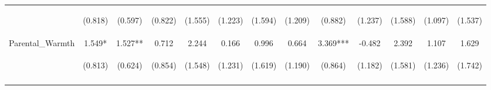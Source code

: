 \begin{tabular}{lcccccccccccc}
 & \begin{footnotesize}(0.818)\end{footnotesize} & \begin{footnotesize}(0.597)\end{footnotesize} & \begin{footnotesize}(0.822)\end{footnotesize} & \begin{footnotesize}(1.555)\end{footnotesize} & \begin{footnotesize}(1.223)\end{footnotesize} & \begin{footnotesize}(1.594)\end{footnotesize} & \begin{footnotesize}(1.209)\end{footnotesize} & \begin{footnotesize}(0.882)\end{footnotesize} & \begin{footnotesize}(1.237)\end{footnotesize} & \begin{footnotesize}(1.588)\end{footnotesize} & \begin{footnotesize}(1.097)\end{footnotesize} & \begin{footnotesize}(1.537)\end{footnotesize}\\
\noalign{\smallskip}Parental_Warmth & 1.549* & 1.527** & 0.712 & 2.244 & 0.166 & 0.996 & 0.664 & 3.369*** & -0.482 & 2.392 & 1.107 & 1.629\\
 & \begin{footnotesize}(0.813)\end{footnotesize} & \begin{footnotesize}(0.624)\end{footnotesize} & \begin{footnotesize}(0.854)\end{footnotesize} & \begin{footnotesize}(1.548)\end{footnotesize} & \begin{footnotesize}(1.231)\end{footnotesize} & \begin{footnotesize}(1.619)\end{footnotesize} & \begin{footnotesize}(1.190)\end{footnotesize} & \begin{footnotesize}(0.864)\end{footnotesize} & \begin{footnotesize}(1.182)\end{footnotesize} & \begin{footnotesize}(1.581)\end{footnotesize} & \begin{footnotesize}(1.236)\end{footnotesize} & \begin{footnotesize}(1.742)\end{footnotesize}\\
\noalign{\smallskip}\hline\end{tabular}\\
